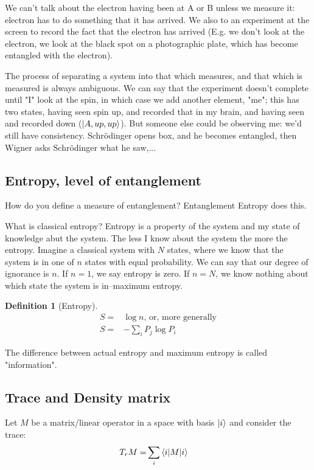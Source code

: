 \documentclass[]{article}
\newtheorem{defn}[thm]{Definition}
\begin{document}
We can't talk about the electron having been at A or B unless we measure it: electron has to do something that it has arrived. We also to an experiment at the screen to record the fact that the electron has arrived (E.g. we don't look at the electron, we look at the black spot on a photographic plate, which has become entangled with the electron).

The process of separating a system into that which measures, and that which is measured is always ambiguous. We can say that the experiment doesn't complete until "I" look at the spin, in which case we add another element, "me"; this has two states, having seen spin up, and recorded that in my brain, and having seen and recorded down ($\ket{A,up,up}$). But someone else could be observing me: we'd still have consistency. Schr\"odinger opens box, and he becomes entangled, then Wigner asks Schr\"odinger what he saw,...

\subsection{Entropy, level of entanglement}  

How do you define a measure of entanglement? Entanglement Entropy does this.

What is classical entropy? Entropy is a property of the system and my state of knowledge abut the system. The less I know about the system the more the entropy. Imagine a classical system with $N$ states, where we know that the system is in one of $n$ states with equal probability. We can say that our degree of ignorance is $n$. If $n=1$, we say entropy is zero. If $n=N$, we know nothing about which state the system is in--maximum entropy.
\begin{defn}[Entropy]
	\begin{align*}
		S=&\log{n}\text{, or, more generally}\\
		S =&- \sum_i P_j \log{P_i}
	\end{align*}
\end{defn}

The difference between actual entropy and maximum entropy is called "information".

\subsection{Trace and Density matrix }

Let $M$ be a matrix/linear operator in a space with basis $\ket{i}$ and consider the trace:
\begin{align*}
	T_r M =& \sum_i \braket{i\vert M \vert i}
\end{align*}
\end{document}
